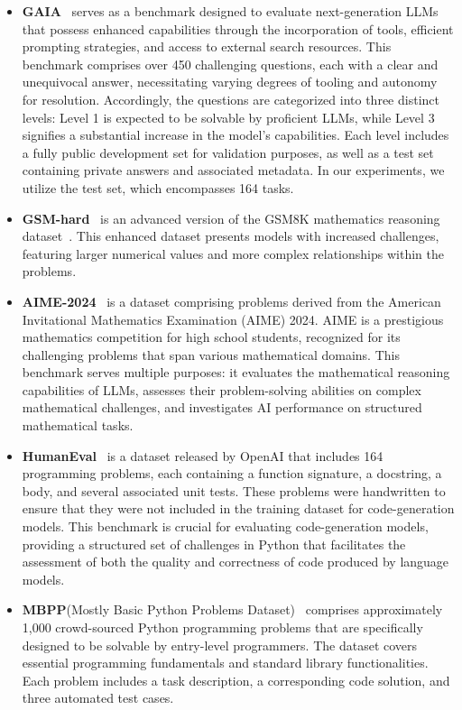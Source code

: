 \begin{itemize}[left=0pt]
    \item \textbf{GAIA}~\citep{mialon2023gaiabenchmarkgeneralai} serves as a benchmark designed to evaluate next-generation LLMs that possess enhanced capabilities through the incorporation of tools, efficient prompting strategies, and access to external search resources. This benchmark comprises over 450 challenging questions, each with a clear and unequivocal answer, necessitating varying degrees of tooling and autonomy for resolution. Accordingly, the questions are categorized into three distinct levels: Level 1 is expected to be solvable by proficient LLMs, while Level 3 signifies a substantial increase in the model's capabilities. Each level includes a fully public development set for validation purposes, as well as a test set containing private answers and associated metadata. In our experiments, we utilize the test set, which encompasses 164 tasks.
    \item \textbf{GSM-hard}~\citep{gao2022pal} is an advanced version of the GSM8K mathematics reasoning dataset~\citep{cobbe2021gsm8k}. This enhanced dataset presents models with increased challenges, featuring larger numerical values and more complex relationships within the problems.
    \item \textbf{AIME-2024}~\citep{HuggingFaceH4_AIME_2024} is a dataset comprising problems derived from the American Invitational Mathematics Examination (AIME) 2024. AIME is a prestigious mathematics competition for high school students, recognized for its challenging problems that span various mathematical domains. This benchmark serves multiple purposes: it evaluates the mathematical reasoning capabilities of LLMs, assesses their problem-solving abilities on complex mathematical challenges, and investigates AI performance on structured mathematical tasks.
    \item \textbf{HumanEval}~\citep{chen2021evaluatinglargelanguagemodels} is a dataset released by OpenAI that includes 164 programming problems, each containing a function signature, a docstring, a body, and several associated unit tests. These problems were handwritten to ensure that they were not included in the training dataset for code-generation models. This benchmark is crucial for evaluating code-generation models, providing a structured set of challenges in Python that facilitates the assessment of both the quality and correctness of code produced by language models.
    \item \textbf{MBPP}(Mostly Basic Python Problems Dataset)~\citep{austin2021programsynthesislargelanguage} comprises approximately 1,000 crowd-sourced Python programming problems that are specifically designed to be solvable by entry-level programmers. The dataset covers essential programming fundamentals and standard library functionalities. Each problem includes a task description, a corresponding code solution, and three automated test cases.

\end{itemize}
